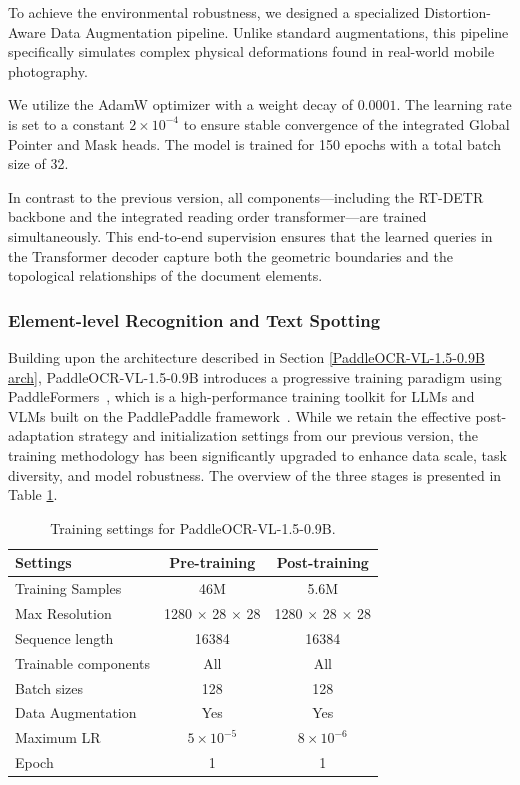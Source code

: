 \documentclass[11pt, a4paper,logo,  copyright, nonumbering]{paddleocr}
\begin{document}
To achieve the environmental robustness, we designed a specialized Distortion-Aware Data Augmentation pipeline. Unlike standard augmentations, this pipeline specifically simulates complex physical deformations found in real-world mobile photography.

We utilize the AdamW optimizer with a weight decay of $0.0001$. The learning rate is set to a constant $2 \times 10^{-4}$ to ensure stable convergence of the integrated Global Pointer and Mask heads. The model is trained for 150 epochs with a total batch size of 32. 

In contrast to the previous version, all components—including the RT-DETR backbone and the integrated reading order transformer—are trained simultaneously. This end-to-end supervision ensures that the learned queries in the Transformer decoder capture both the geometric boundaries and the topological relationships of the document elements.

\subsubsection{Element-level Recognition and Text Spotting}
\label{training_strategy}

Building upon the architecture described in Section \ref{PaddleOCR-VL-1.5-0.9B arch}, PaddleOCR-VL-1.5-0.9B introduces a progressive training paradigm using PaddleFormers~\cite{PaddlePaddle_PaddleFormers}, which is a high-performance training toolkit for LLMs and VLMs built on the PaddlePaddle framework~\cite{ma2019paddlepaddle}. While we retain the effective post-adaptation strategy and initialization settings from our previous version, the training methodology has been significantly upgraded to enhance data scale, task diversity, and model robustness. The overview of the three stages is presented in Table \ref{training}.

\begin{table}[h]
\centering
 \fontsize{8}{8}\selectfont
\renewcommand{\arraystretch}{1.2}
\begin{tabular}{l|cc}
\toprule
\textbf{Settings} & \textbf{Pre-training} & \textbf{Post-training}  \\  \midrule
Training Samples & 46M  & 5.6M  \\
Max Resolution & 1280 $\times$ 28 $\times$ 28 & 1280 $\times$ 28 $\times$ 28  \\
Sequence length & 16384 & 16384 \\
Trainable components & All & All \\
Batch sizes & 128 & 128  \\
Data Augmentation & Yes & Yes  \\
Maximum LR & $5 \times 10^{-5}$ & $8 \times 10^{-6}$  \\
Epoch & 1 & 1  \\ \bottomrule
\end{tabular}
\caption{Training settings for PaddleOCR-VL-1.5-0.9B.}
\label{training}
\end{table}
\end{document}
